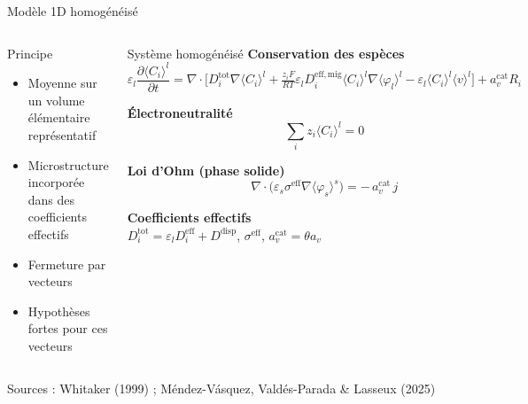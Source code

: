 \begin{frame}[t]{Modèle 1D homogénéisé}
  \vspace{-2.5em}

  \begin{columns}[T,onlytextwidth]

    \column{\textwidth}
      \begin{pcbanner}{Principe}
        \begin{itemize}\footnotesize
          \item Moyenne sur un volume élémentaire représentatif
          \item Microstructure incorporée dans des coefficients effectifs
          \item Fermeture par vecteurs
          \item Hypothèses fortes pour ces vecteurs
        \end{itemize}
      \end{pcbanner}

      \vspace{-0.5em}
      \begin{pcbanner}{Système homogénéisé}
        \centering\scriptsize
        \textbf{Conservation des espèces}
        \[ \varepsilon_l\frac{\partial \langle C_i\rangle^l}{\partial t}
           = \nabla\!\cdot\!\Big[ D_i^{\mathrm{tot}}\nabla\langle C_i\rangle^l
           + \tfrac{z_i F}{RT}\varepsilon_l D_i^{\mathrm{eff,mig}}
             \langle C_i\rangle^l \nabla\langle\varphi_l\rangle^l
           - \varepsilon_l \langle C_i\rangle^l \langle v\rangle^l \Big]
           + a_v^{\mathrm{cat}} R_i \]

                \begin{minipage}[t]{0.48\linewidth}
          \centering
          \textbf{Électroneutralité}
          \[ \sum_i z_i \langle C_i\rangle^l = 0 \]
        \end{minipage}\hfill
        \begin{minipage}[t]{0.48\linewidth}
          \centering
          \textbf{Loi d'Ohm (phase solide)}
          \[ \nabla\!\cdot\!\big(\varepsilon_s \sigma^{\mathrm{eff}}
             \nabla\langle\varphi_s\rangle^s\big) = -\,a_v^{\mathrm{cat}}\, j \]
        \end{minipage}

        \vspace{0.3em}
        \textbf{Coefficients effectifs}\\[0.2em]
        $D_i^{\mathrm{tot}} = \varepsilon_l D_i^{\mathrm{eff}} + D^{\mathrm{disp}}$,
        \quad $\sigma^{\mathrm{eff}}$, \quad $a_v^{\mathrm{cat}} = \theta a_v$
      \end{pcbanner}

  \end{columns}
  {\tiny\color{pcNavy!60} Sources : Whitaker (1999) ; Méndez-Vásquez, Valdés-Parada \& Lasseux (2025)}
\end{frame}

